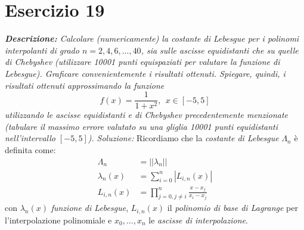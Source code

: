 \section{Esercizio 19}

\textit{\textbf{Descrizione:}  Calcolare (numericamente) la \emph{costante di Lebesgue} per i polinomi interpolanti di grado
$n = 2,4,6,...,40$, sia sulle ascisse equidistanti che su quelle di \emph{Chebyshev} (utilizzare 10001 punti equispaziati per valutare la funzione di Lebesgue).
Graficare convenientemente i risultati ottenuti.
Spiegare, quindi, i risultati ottenuti approssimando la funzione\\
\[
f(x)=\frac{1}{1+x^2},\ \  x \in [-5,5]
\]
utilizzando le ascisse equidistanti e di \emph{Chebyshev} precedentemente menzionate (tabulare il massimo errore valutato su una gliglia 10001 punti equidistanti nell'intervallo $[-5,5]$).}
\newline
\noindent\emph{Soluzione: }\newline
Ricordiamo che la \emph{costante di Lebesgue} $\Lambda_n$ è definita come:\\
\[
\begin{aligned}
\Lambda_n &= || \lambda_n||\\
\lambda_n(x) &= \sum_{i=0}^{n} |L_{i,n}(x)|\\
L_{i,n}(x) &= \prod_{j=0, j\neq i}^{n} \frac{x-x_j}{x_i-x_j}
\end{aligned}
\]
con $\lambda_n(x)$  \emph{funzione di Lebesgue}, $L_{i,n}(x)$ il \emph{polinomio di base di Lagrange} per l'interpolazione polinomiale e $x_0,...,x_n$ le \emph{ascisse di interpolazione}.\\
